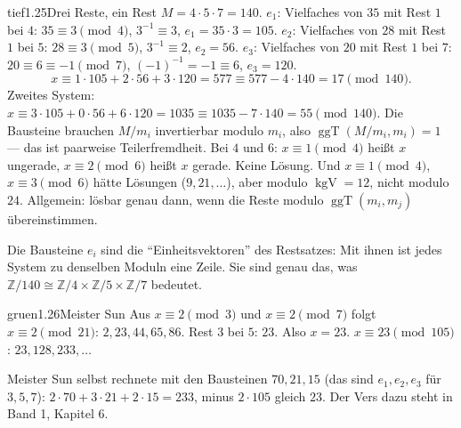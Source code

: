 \begin{loesungkarte}{tief}{1.25}{Drei Reste, ein Rest}
$M = 4\cdot5\cdot7 = 140$. $e_1$: Vielfaches von $35$ mit Rest $1$ bei $4$: $35\equiv3\pmod4$, $3^{-1}\equiv3$, $e_1 = 35\cdot3 = 105$. $e_2$: Vielfaches von $28$ mit Rest $1$ bei $5$: $28\equiv3\pmod5$, $3^{-1}\equiv2$, $e_2 = 56$. $e_3$: Vielfaches von $20$ mit Rest $1$ bei $7$: $20\equiv6\equiv-1\pmod7$, $(-1)^{-1} = -1\equiv6$, $e_3 = 120$.
\[ x\equiv1\cdot105 + 2\cdot56 + 3\cdot120 = 577\equiv577 - 4\cdot140 = 17\pmod{140} . \]
Zweites System: $x\equiv3\cdot105 + 0\cdot56 + 6\cdot120 = 1035\equiv1035 - 7\cdot140 = 55\pmod{140}$.
Die Bausteine brauchen $M/m_i$ invertierbar modulo $m_i$, also $\operatorname{ggT}(M/m_i, m_i) = 1$ --- das ist paarweise Teilerfremdheit. Bei $4$ und $6$: $x\equiv1\pmod4$ heißt $x$ ungerade, $x\equiv2\pmod6$ heißt $x$ gerade. Keine Lösung. Und $x\equiv1\pmod4$, $x\equiv3\pmod6$ hätte Lösungen ($9, 21, \dots$), aber modulo $\operatorname{kgV} = 12$, nicht modulo $24$. Allgemein: lösbar genau dann, wenn die Reste modulo $\operatorname{ggT}(m_i, m_j)$ übereinstimmen.
\begin{mitnehmen}\kastentext
Die Bausteine $e_i$ sind die \enquote{Einheitsvektoren} des Restsatzes: Mit ihnen ist jedes System zu denselben Moduln eine Zeile. Sie sind genau das, was $\mathbb Z/140\cong\mathbb Z/4\times\mathbb Z/5\times\mathbb Z/7$ bedeutet.
\end{mitnehmen}
\end{loesungkarte}

\begin{loesungkarte}{gruen}{1.26}{Meister Sun}
Aus $x\equiv2\pmod3$ und $x\equiv2\pmod7$ folgt $x\equiv2\pmod{21}$: $2, 23, 44, 65, 86$. Rest $3$ bei $5$: $23$. Also $x = 23$.
$x\equiv23\pmod{105}$: $23, 128, 233, \dots$
\begin{mitnehmen}\kastentext
Meister Sun selbst rechnete mit den Bausteinen $70, 21, 15$ (das sind $e_1, e_2, e_3$ für $3, 5, 7$): $2\cdot70 + 3\cdot21 + 2\cdot15 = 233$, minus $2\cdot105$ gleich $23$. Der Vers dazu steht in Band 1, Kapitel 6.
\end{mitnehmen}
\end{loesungkarte}


